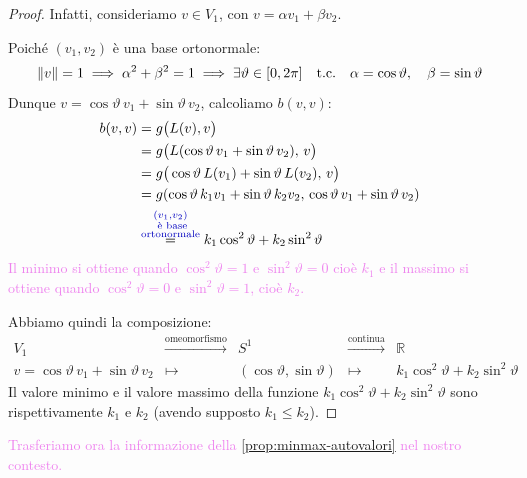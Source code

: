         \begin{proof}
        \mbox{}

        Infatti, consideriamo $v \in V_1$, con $v = \alpha v_1 + \beta v_2$. 
        
        Poiché $(v_1, v_2)$ è una base ortonormale:
        \[
        \lVert v\rVert = 1 \implies \alpha^2 + \beta^2 = 1 \implies \exists \vartheta \in [0, 2\pi] \quad \text{t.c.} \quad \alpha = \cos\vartheta, \quad \beta = \sin\vartheta
        \]
        Dunque $v = \cos\vartheta \, v_1 + \sin\vartheta \, v_2$, calcoliamo $b(v,v)$:
        \begin{align*}
        b(v,v) &= g\big(L(v), v\big) \\
        &= g\big(L(\cos\vartheta \, v_1 + \sin\vartheta \, v_2), \, v\big) \\
        &= g\big(\cos\vartheta \, L(v_1) + \sin\vartheta \, L(v_2), \, v\big) \\
        &= g(\cos\vartheta \, k_1 v_1 + \sin\vartheta \, k_2 v_2, \, \cos\vartheta \, v_1 + \sin\vartheta \, v_2) \\
        &\overset{\textcolor{blu}{\substack{(v_1, v_2) \\ \text{ è base} \\ \text{ortonormale}}}}{=} k_1 \cos^2\vartheta + k_2 \sin^2\vartheta
        \end{align*}
        \textcolor{violet}{Il minimo si ottiene quando $\cos^2 \vartheta =1$ e $\sin^2 \vartheta=0$
        cioè $k_1$ e il massimo si ottiene quando $\cos^2 \vartheta =0$ e $\sin^2 \vartheta=1$, cioè $k_2$.}

        Abbiamo quindi la composizione:
        \[
        \begin{array}{ccccc}
        V_1 & \xrightarrow{\text{omeomorfismo}} & S^1 & \xrightarrow{\text{continua}} & \mathbb{R} \\[6pt]
        v = \cos\vartheta \, v_1 + \sin\vartheta \, v_2 & \longmapsto & (\cos\vartheta, \sin\vartheta) & \longmapsto & k_1 \cos^2\vartheta + k_2 \sin^2\vartheta
        \end{array}
        \]
        Il valore minimo e il valore massimo della funzione $k_1 \cos^2\vartheta + k_2 \sin^2\vartheta$ sono rispettivamente $k_1$ e $k_2$ (avendo supposto $k_1 \le k_2$).
        \end{proof}

        \newpage
        \textcolor{violet}{Trasferiamo ora la informazione della \ref{prop:minmax-autovalori} nel nostro contesto.}
        
